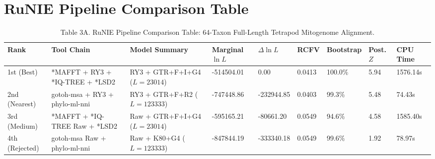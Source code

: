 \documentclass[10pt,letterpaper]{article}
\begin{document}
\section{RuNIE Pipeline Comparison Table}
\begin{table}[htbp]
\centering
\caption{Table 3A. RuNIE Pipeline Comparison Table: 64-Taxon Full-Length Tetrapod Mitogenome Alignment.}
\footnotesize
\begin{tabular}{lllllllll}
\toprule
Rank & Tool Chain & Model Summary & Marginal $\ln L$ & $\Delta \ln L$ & RCFV & Bootstrap & Post. $Z$ & CPU Time \\
\midrule
1st (Best) & *MAFFT + RY3 + *IQ-TREE + *LSD2 & RY3 + GTR+F+I+G4 ($L=23014$) & -514504.01 & 0.00 & 0.0413 & 100.0\% & 5.94 & 1576.14s \\
2nd (Nearest) & gotoh-msa + RY3 + phylo-ml-nni & RY3 + GTR+F+R2 ($L=123333$) & -747448.86 & -232944.85 & 0.0403 & 99.3\% & 5.48 & 74.43s \\
3rd (Medium) & *MAFFT + *IQ-TREE Raw + *LSD2 & Raw + GTR+F+I+G4 ($L=23014$) & -595165.21 & -80661.20 & 0.0549 & 94.6\% & 4.58 & 1585.40s \\
4th (Rejected) & gotoh-msa Raw + phylo-ml-nni & Raw + K80+G4 ($L=123333$) & -847844.19 & -333340.18 & 0.0549 & 99.6\% & 1.92 & 78.97s \\
\bottomrule
\end{tabular}
\end{table}
\end{document}
